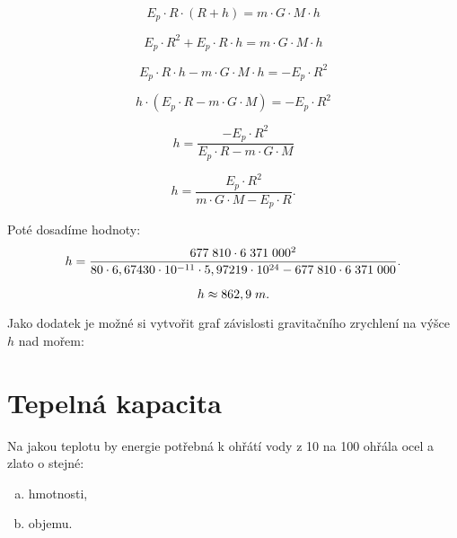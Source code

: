 \documentclass{article}
\begin{document}
$$
    E_p \cdot R \cdot (R + h) = m \cdot G \cdot M \cdot h
$$

$$
    E_p \cdot R^2 + E_p \cdot R \cdot h = m \cdot G \cdot M \cdot h
$$

$$
    E_p \cdot R \cdot h - m \cdot G \cdot M \cdot h = - E_p \cdot R^2
$$

$$
    h \cdot (E_p \cdot R - m \cdot G \cdot M) = - E_p \cdot R^2
$$

$$
    h = \frac{- E_p \cdot R^2}{E_p \cdot R - m \cdot G \cdot M}
$$

$$
    h = \frac{E_p \cdot R^2}{m \cdot G \cdot M - E_p \cdot R}.
$$

Poté dosadíme hodnoty:
$$
    h = \frac{677 \; 810 \cdot 6 \; 371 \; 000^2}{80 \cdot 6,67430 \cdot 10^{-11} \cdot 5,97219 \cdot 10^{24} - 677 \; 810 \cdot 6 \; 371 \; 000}.
$$

$$
    h \approx 862,9 \; m.
$$

Jako dodatek je možné si vytvořit graf závislosti gravitačního zrychlení na výšce $h$ nad mořem:

\begin{center}
\end{center}

\newpage



\section{ Tepelná kapacita \spicy}
Na jakou teplotu by energie potřebná k ohřátí vody z 10 \ueqCELS \fs na 100 \ueqCELS \fs ohřála ocel a zlato o stejné:

\begin{enumerate}[a)]
    \item hmotnosti,
    \item objemu.
\end{enumerate}
\end{document}
